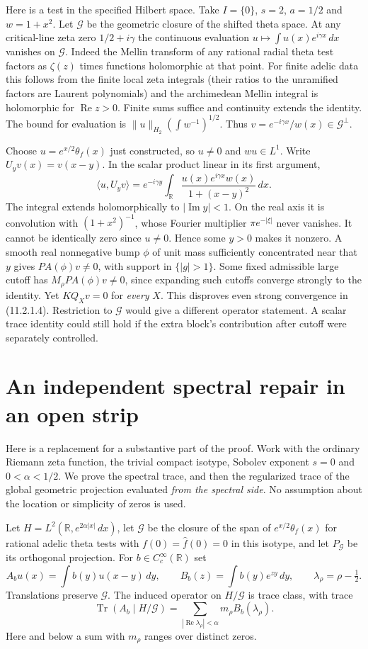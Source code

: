 \documentclass[11pt,letterpaper]{article}
\newcommand{\R}{\mathbb R}
\newcommand{\Gg}{\mathcal G}
\newcommand{\Tr}{\operatorname{Tr}}
\newcommand{\re}{\operatorname{Re}}
\newcommand{\im}{\operatorname{Im}}
\begin{document}
Here is a test in the specified Hilbert space. Take $I=\{0\}$, $s=2$, $a=1/2$ and $w=1+x^2$. Let $\Gg$ be the geometric closure of the shifted theta space. At any critical-line zeta zero $1/2+i\gamma$ the continuous evaluation $u\mapsto\int u(x)e^{i\gamma x}\,dx$ vanishes on $\Gg$. Indeed the Mellin transform of any rational radial theta test factors as $\zeta(z)$ times functions holomorphic at that point. For finite adelic data this follows from the finite local zeta integrals (their ratios to the unramified factors are Laurent polynomials) and the archimedean Mellin integral is holomorphic for $\re z>0$. Finite sums suffice and continuity extends the identity. The bound for evaluation is $\|u\|_{H_2}(\int w^{-1})^{1/2}$. Thus $v=e^{-i\gamma x}/w(x)\in\Gg^\perp$.

Choose $u=e^{x/2}\theta_f(x)$ just constructed, so $u\ne0$ and $wu\in L^1$. Write $U_yv(x)=v(x-y)$. In the scalar product linear in its first argument,
\[
 \langle u,U_yv\rangle=e^{-i\gamma y}
 \int_{\R}\frac{u(x)e^{i\gamma x}w(x)}{1+(x-y)^2}\,dx .
\]
The integral extends holomorphically to $|\im y|<1$. On the real axis it is convolution with $(1+x^2)^{-1}$, whose Fourier multiplier $\pi e^{-|\xi|}$ never vanishes. It cannot be identically zero since $u\ne0$. Hence some $y>0$ makes it nonzero. A smooth real nonnegative bump $\phi$ of unit mass sufficiently concentrated near that $y$ gives $PA(\phi)v\ne0$, with support in $\{|g|>1\}$. Some fixed admissible large cutoff has $M_\rho PA(\phi)v\ne0$, since expanding such cutoffs converge strongly to the identity. Yet $KQ_Xv=0$ for \emph{every} $X$. This disproves even strong convergence in (11.2.1.4). Restriction to $\Gg$ would give a different operator statement. A scalar trace identity could still hold if the extra block's contribution after cutoff were separately controlled.

\section{An independent spectral repair in an open strip}\label{sec:hardy}

Here is a replacement for a substantive part of the proof. Work with the ordinary Riemann zeta function, the trivial compact isotype, Sobolev exponent $s=0$ and $0<\alpha<1/2$. We prove the spectral trace, and then the regularized trace of the global geometric projection evaluated \emph{from the spectral side}. No assumption about the location or simplicity of zeros is used.

Let $H=L^2(\R,e^{2\alpha|x|}\,dx)$, let $\Gg$ be the closure of the span of $e^{x/2}\theta_f(x)$ for rational adelic theta tests with $f(0)=\widehat f(0)=0$ in this isotype, and let $P_{\Gg}$ be its orthogonal projection. For $b\in C_c^\infty(\R)$ set
\[
 A_bu(x)=\int b(y)u(x-y)\,dy,\qquad
 B_b(z)=\int b(y)e^{zy}\,dy,\qquad \lambda_\rho=\rho-\tfrac12 .
\]
Translations preserve $\Gg$. The induced operator on $H/\Gg$ is trace class, with trace
\begin{equation}
 \Tr(A_b\mid H/\Gg)=\sum_{|\re\lambda_\rho|<\alpha}m_\rho B_b(\lambda_\rho).
 \label{eq:positive}
\end{equation}
Here and below a sum with $m_\rho$ ranges over distinct zeros.
\end{document}
